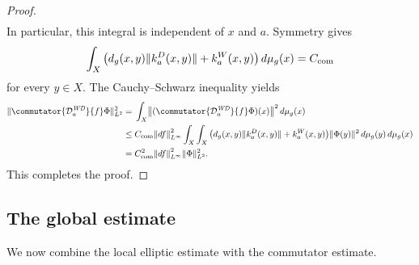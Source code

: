 \documentclass[a4paper,oneside,12pt]{amsart}
\theoremstyle{plain}
\theoremstyle{definition}
\theoremstyle{remark}
\DeclarePairedDelimiter{\norm}{\lVert}{\rVert}
\newcommand{\dvol}{d\mu}
\newcommand{\Ltwonorm}[2][L^2]{\norm{#2}_{#1}}
\newcommand{\mesoscopicWilsonDiracoperator}[1][a]{\mathcal{D}_{#1}^{\mathit{WD}}}
\newcommand{\integralkernel}{k}
\newcommand{\kernelDirac}{\integralkernel_a^D}
\newcommand{\kernelWilson}{\integralkernel_a^W}
\newcommand{\constantcommutator}{C_{\mathrm{com}}}
\begin{document}
\begin{proof}
\begin{equation}
\begin{aligned}
    \end{aligned}
  \end{equation}
  In particular, this integral is independent of $x$ and $a$.
  Symmetry gives
  \begin{equation}
    \int_X \big( d_g(x,y) \norm{\kernelDirac(x,y)} + \kernelWilson(x,y) \big) \,\dvol_g(x) = \constantcommutator
  \end{equation}
  for every $y \in X$.
  The Cauchy--Schwarz inequality yields
  \begin{equation}
    \begin{aligned}
      \Ltwonorm{\commutator{\mesoscopicWilsonDiracoperator}{f}\Phi}^2 ={}& \int_X \norm*{(\commutator{\mesoscopicWilsonDiracoperator}{f}\Phi)(x)}^2 \,\dvol_g(x) \\
      \le{}& \constantcommutator \norm*{df}_{L^{\infty}}^2 \int_X \int_X \big( d_g(x,y) \norm{\kernelDirac(x,y)} + \kernelWilson(x,y) \big) \norm{\Phi(y)}^2 \,\dvol_g(y) \,\dvol_g(x) \\
      ={}& \constantcommutator^2 \norm*{df}_{L^{\infty}}^2 \Ltwonorm{\Phi}^2.
    \end{aligned}
  \end{equation}
  This completes the proof.
\end{proof}

\subsection{The global estimate}

We now combine the local elliptic estimate with the commutator estimate.
\end{document}
